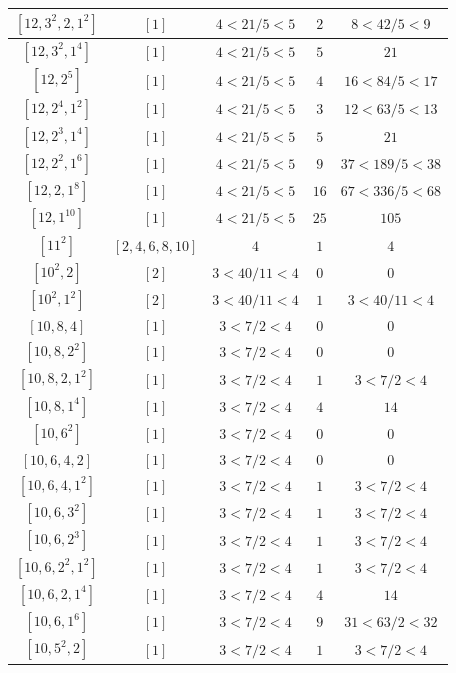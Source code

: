 \documentclass{article}%
\begin{document}
\begin{center}
\begin{longtable}{||c|c|c|c|c||}
$[12, 3^{2}, 2, 1^{2}]$ & $[1]$ & $4 < 21/5 < 5$ & $2$ & $8 < 42/5 < 9$ \\ \hline 
$[12, 3^{2}, 1^{4}]$ & $[1]$ & $4 < 21/5 < 5$ & $5$ & $21$ \\ \hline 
$[12, 2^{5}]$ & $[1]$ & $4 < 21/5 < 5$ & $4$ & $16 < 84/5 < 17$ \\ \hline 
$[12, 2^{4}, 1^{2}]$ & $[1]$ & $4 < 21/5 < 5$ & $3$ & $12 < 63/5 < 13$ \\ \hline 
$[12, 2^{3}, 1^{4}]$ & $[1]$ & $4 < 21/5 < 5$ & $5$ & $21$ \\ \hline 
$[12, 2^{2}, 1^{6}]$ & $[1]$ & $4 < 21/5 < 5$ & $9$ & $37 < 189/5 < 38$ \\ \hline 
$[12, 2, 1^{8}]$ & $[1]$ & $4 < 21/5 < 5$ & $16$ & $67 < 336/5 < 68$ \\ \hline 
$[12, 1^{10}]$ & $[1]$ & $4 < 21/5 < 5$ & $25$ & $105$ \\ \hline 
$[11^{2}]$ & $[2, 4, 6, 8, 10]$ & $4$ & $1$ & $4$ \\ \hline 
$[10^{2}, 2]$ & $[2]$ & $3 < 40/11 < 4$ & $0$ & $0$ \\ \hline 
$[10^{2}, 1^{2}]$ & $[2]$ & $3 < 40/11 < 4$ & $1$ & $3 < 40/11 < 4$ \\ \hline 
$[10, 8, 4]$ & $[1]$ & $3 < 7/2 < 4$ & $0$ & $0$ \\ \hline 
$[10, 8, 2^{2}]$ & $[1]$ & $3 < 7/2 < 4$ & $0$ & $0$ \\ \hline 
$[10, 8, 2, 1^{2}]$ & $[1]$ & $3 < 7/2 < 4$ & $1$ & $3 < 7/2 < 4$ \\ \hline 
$[10, 8, 1^{4}]$ & $[1]$ & $3 < 7/2 < 4$ & $4$ & $14$ \\ \hline 
$[10, 6^{2}]$ & $[1]$ & $3 < 7/2 < 4$ & $0$ & $0$ \\ \hline 
$[10, 6, 4, 2]$ & $[1]$ & $3 < 7/2 < 4$ & $0$ & $0$ \\ \hline 
$[10, 6, 4, 1^{2}]$ & $[1]$ & $3 < 7/2 < 4$ & $1$ & $3 < 7/2 < 4$ \\ \hline 
$[10, 6, 3^{2}]$ & $[1]$ & $3 < 7/2 < 4$ & $1$ & $3 < 7/2 < 4$ \\ \hline 
$[10, 6, 2^{3}]$ & $[1]$ & $3 < 7/2 < 4$ & $1$ & $3 < 7/2 < 4$ \\ \hline 
$[10, 6, 2^{2}, 1^{2}]$ & $[1]$ & $3 < 7/2 < 4$ & $1$ & $3 < 7/2 < 4$ \\ \hline 
$[10, 6, 2, 1^{4}]$ & $[1]$ & $3 < 7/2 < 4$ & $4$ & $14$ \\ \hline 
$[10, 6, 1^{6}]$ & $[1]$ & $3 < 7/2 < 4$ & $9$ & $31 < 63/2 < 32$ \\ \hline 
$[10, 5^{2}, 2]$ & $[1]$ & $3 < 7/2 < 4$ & $1$ & $3 < 7/2 < 4$ \\ \hline 

\end{longtable}
\end{center}
\end{document}
